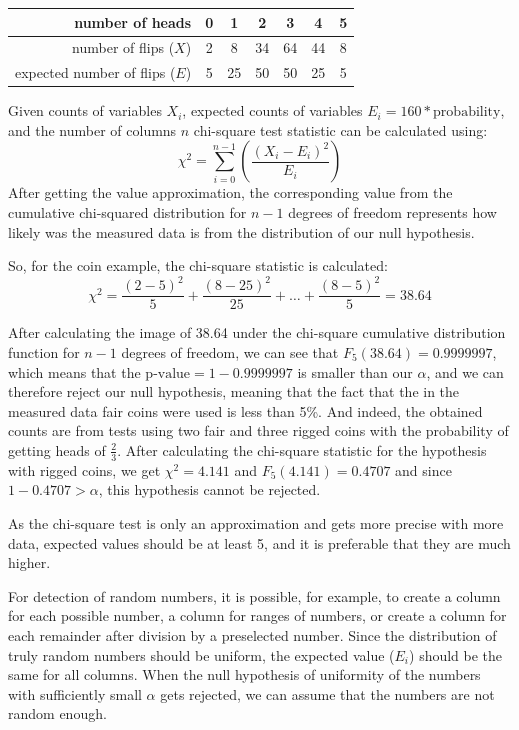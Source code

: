 \documentclass[
  digital, %
  oneside, %
  lof,     %
  lot,     %
]{fithesis4}
\begin{document}
\begin{center}
    \begin{tabular}{r | c c c c c c}
         number of heads & 0 & 1 & 2 & 3 & 4 & 5 \\ \hline
         number of flips ($X$) & 2 & 8 & 34 & 64 & 44 & 8 \\
         expected number of flips ($E$) & 5 & 25 & 50 & 50 & 25 & 5
    \end{tabular}
\end{center}
Given counts of variables $X_i$, expected counts of variables $E_i = 160 * \text{probability}$, and the number of columns $n$ chi-square test statistic can be calculated using: 
$$\chi^2 = \sum^{n - 1}_{i = 0}{\left(\frac{(X_i - E_i)^2}{E_i}\right)}$$
After getting the value approximation, the corresponding value from the cumulative chi-squared distribution for $n - 1$ degrees of freedom represents how likely was the measured data is from the distribution of our null hypothesis.

So, for the coin example, the chi-square statistic is calculated:
$$\chi^2 = \frac{(2 - 5)^2}{5} + \frac{(8 - 25)^2}{25} + \dots + \frac{(8 - 5)^2}{5} = 38.64$$

After calculating the image of 38.64 under the chi-square cumulative distribution function for $n - 1$ degrees of freedom, we can see that $F_5(38.64) = 0.9999997$, which means that the $\text{p-value} = 1 - 0.9999997$ is smaller than our $\alpha$, and we can therefore reject our null hypothesis, meaning that the fact that the in the measured data fair coins were used is less than 5\%.
And indeed, the obtained counts are from tests using two fair and three rigged coins with the probability of getting heads of $\frac{2}{3}$.
After calculating the chi-square statistic for the hypothesis with rigged coins, we get $\chi^2 = 4.141$ and $F_5(4.141) = 0.4707$ and since $1 - 0.4707 > \alpha$, this hypothesis cannot be rejected.

As the chi-square test is only an approximation and gets more precise with more data, expected values should be at least 5, and it is preferable that they are much higher. \cite{knuth81}

For detection of random numbers, it is possible, for example, to create a column for each possible number, a column for ranges of numbers, or create a column for each remainder after division by a preselected number.
Since the distribution of truly random numbers should be uniform, the expected value ($E_i$) should be the same for all columns. 
When the null hypothesis of uniformity of the numbers with sufficiently small $\alpha$ gets rejected, we can assume that the numbers are not random enough.
\end{document}
